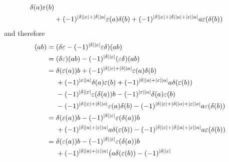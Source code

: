 \begin{enumerate}
\begin{align*}
        \delta(a) \varepsilon(b)
      \\
      {}&
      + (-1)^{\lvert\delta\rvert \lvert\varepsilon\rvert + \lvert\delta\rvert \lvert a\rvert}
        \varepsilon(a) \delta(b)
      + (-1)^{\lvert\delta\rvert \lvert\varepsilon\rvert  + \lvert\delta\rvert \lvert a\rvert + \lvert\varepsilon\rvert \lvert a\rvert}
        a \varepsilon(\delta(b))
    \end{align*}
    and therefore
    \begingroup
    \allowdisplaybreaks
    \begin{align*}
      [\delta, \varepsilon](ab)
      ={}&
      (\delta \varepsilon - (-1)^{\hdeg{\delta} \hdeg{\varepsilon}} \varepsilon \delta)(ab)
      \\
      ={}&
        (\delta \varepsilon)(ab)
      - (-1)^{\hdeg{\delta} \hdeg{\varepsilon}}
        (\varepsilon \delta)(ab)
      \\
      ={}&
        \delta(\varepsilon(a)) b
      + (-1)^{\hdeg{\delta} \hdeg{\varepsilon} + \hdeg{\delta} \hdeg{a}}
        \varepsilon(a) \delta(b)
      \\
      {}&
      + (-1)^{\hdeg{\varepsilon} \hdeg{a}}
        \delta(a) \varepsilon(b)
      + (-1)^{\hdeg{\delta} \hdeg{a} + \hdeg{\varepsilon} \hdeg{a}}
        a \delta(\varepsilon(b))
      \\
      {}&
      - (-1)^{\hdeg{\delta} \hdeg{\varepsilon}}
        \varepsilon(\delta(a)) b
      - (-1)^{\hdeg{\varepsilon} \hdeg{a}}
        \delta(a) \varepsilon(b)
      \\
      {}&
      - (-1)^{\hdeg{\delta} \hdeg{\varepsilon} + \hdeg{\delta} \hdeg{a}}
        \varepsilon(a) \delta(b)
      - (-1)^{\hdeg{\delta} \hdeg{\varepsilon}  + \hdeg{\delta} \hdeg{a} + \hdeg{\varepsilon} \hdeg{a}}
        a \varepsilon(\delta(b))
      \\
      ={}&
        \delta(\varepsilon(a)) b
      - (-1)^{\hdeg{\delta} \hdeg{\varepsilon}}
        \varepsilon(\delta(a)) b
      \\
      {}&
      + (-1)^{\hdeg{\delta} \hdeg{a} + \hdeg{\varepsilon} \hdeg{a}}
        a \delta(\varepsilon(b))
      - (-1)^{\hdeg{\delta} \hdeg{\varepsilon}  + \hdeg{\delta} \hdeg{a} + \hdeg{\varepsilon} \hdeg{a}}
        a \varepsilon(\delta(b))
      \\
      ={}&
        \delta(\varepsilon(a)) b
      - (-1)^{\hdeg{\delta} \hdeg{\varepsilon}}
        \varepsilon(\delta(a)) b
      \\
      {}&
      + (-1)^{\hdeg{\delta} \hdeg{a} + \hdeg{\varepsilon} \hdeg{a}}
        \bigl(
            a \delta(\varepsilon(b))
          - (-1)^{\hdeg{\delta} \hdeg{\varepsilon}}

\end{align*}
\end{enumerate}
